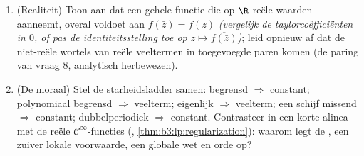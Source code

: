 \begin{problem}
\begin{enumerate}[resume]
        \cref{ch:b3:residues} elke $\zeta(2k)$ beprijzen.
  \item (Realiteit) Toon aan dat een gehele functie die op $\R$
        reële waarden aanneemt, overal voldoet aan $f(\bar z) =
        \overline{f(z)}$ \emph{(vergelijk de taylorcoëfficiënten
        in $0$, of pas de identiteitsstelling toe op $z \mapsto
        \overline{f(\bar z)}$)}; leid opnieuw af dat de
        niet-reële wortels van reële veeltermen in toegevoegde
        paren komen (de paring van vraag 8, analytisch
        herbewezen).
  \item (De moraal) Stel de starheidsladder samen: begrensd
        $\Rightarrow$ constant; polynomiaal begrensd $\Rightarrow$
        veelterm; eigenlijk $\Rightarrow$ veelterm; een schijf
        missend $\Rightarrow$ constant; dubbelperiodiek
        $\Rightarrow$ constant. Contrasteer in een korte alinea
        met de reële $\mathcal C^\infty$-functies (,
        \cref{thm:b3:lp:regularization}): waarom legt de
        , een zuiver lokale voorwaarde, een globale wet
        en orde op?
\end{enumerate}


\end{problem}
